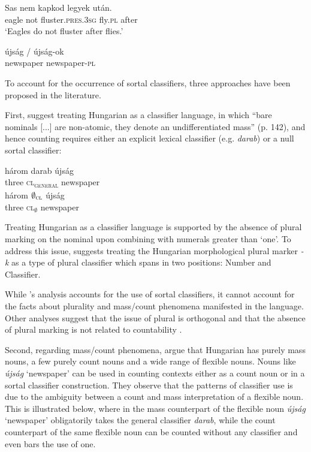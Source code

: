 \documentclass[output=paper]{langscibook}
\begin{document}
\ea \label{schv-nem:ex:4}
\gll Sas nem kapkod legyek után.\\
    eagle not fluster.\textsc{pres}.\textsc{3sg} fly.\textsc{pl}  after\\
\glt `Eagles do not fluster after flies.'
\z

\ea \label{schv-nem:ex:5}
\gll újság / újság-ok\\
   newspaper {} newspaper-\textsc{pl}\\
\z

\noindent To account for the occurrence of sortal classifiers, three approaches have been proposed in the literature.

First, \citet{csirmaz-dekany-14} suggest treating Hungarian as a classifier language, in which ``bare nominals [...] are non-atomic, they denote an undifferentiated mass'' (p. 142), and hence counting requires either an explicit lexical classifier (e.g. \textit{darab}) or a null sortal classifier:

\ea \label{schv-nem:ex:6}
\ea \label{schv-nem:ex:6a}
\gll három darab újság\\  
     three \textsc{cl\textsubscript{general}} newspaper\\ 
\ex \label{schv-nem:ex:6b}
\gll három $\emptyset_{\textsc{cl}}$  újság\\
   three \textsc{cl$_{\emptyset}$} newspaper\\
\z
\z

\noindent Treating Hungarian as a classifier language is supported by the absence of plural marking on the nominal upon combining with numerals greater than ‘one’. To address this issue, \citet{dekany-11} suggests treating the Hungarian morphological plural marker \textit{-k} as a type of plural classifier which spans in two positions: Number and Classifier.

While \citeauthor{csirmaz-dekany-14}'s analysis accounts for the use of sortal classifiers, it cannot account for the facts about plurality and mass/count phenomena manifested in the language. Other analyses suggest that the issue of plural is orthogonal and that the absence of plural marking is not related to countability \citep{borer-05, schvarcz-rothstein-17}.

Second, regarding mass/count phenomena, \citet{schvarcz-rothstein-17} argue that  Hungarian has purely mass nouns, a few purely count nouns and a wide range of flexible nouns. Nouns like \textit{újság} `newspaper' can be used in counting contexts either as a count noun or in a sortal classifier construction. They observe that the patterns of classifier use is due to the ambiguity between a count and mass interpretation of a flexible noun. This is illustrated below, where in  the mass counterpart of the flexible noun \textit{újság} `newspaper’ obligatorily takes the general classifier \textit{darab}, while the count counterpart of the same flexible noun  can be counted without any classifier and even bars the use of one. 
\end{document}
